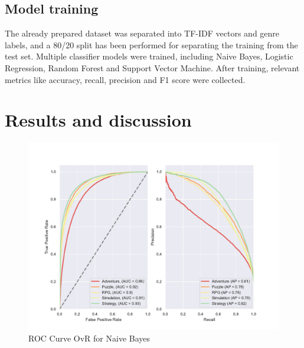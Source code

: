 \documentclass[11pt, a4paper]{article}
\begin{document}
\subsection{Model training}\label{subsec:model-training}
The already prepared dataset was separated into TF-IDF vectors and genre labels, and a 80/20 split has been performed
for separating the training from the test set.
Multiple classifier models were trained, including Naive Bayes, Logistic Regression, Random Forest and Support Vector
Machine.
After training, relevant metrics like accuracy, recall, precision and F1 score were collected.




\section{Results and discussion}\label{sec:results-and-discussion}








\begin{figure}
    \centering
    \includegraphics[width=\textwidth]{data/results/plots/naive_bayes_roc}
    \caption{ROC Curve OvR for Naive Bayes}
    \label{fig:nb_roc_fig}
\end{figure}
\end{document}
